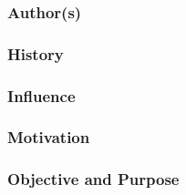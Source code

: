 \subsubsection{Author(s)}

\subsubsection{History}

\subsubsection{Influence}

\subsubsection{Motivation}

\subsubsection{Objective and Purpose}
